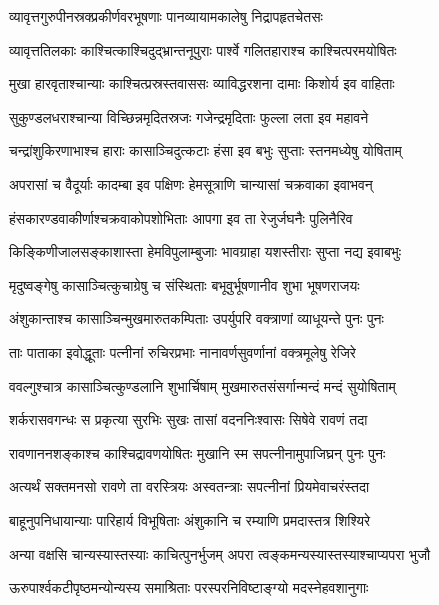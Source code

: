 \twolineshloka
{व्यावृत्तगुरुपीनस्रक्प्रकीर्णवरभूषणाः}
{पानव्यायामकालेषु निद्रापहृतचेतसः} %

\twolineshloka
{व्यावृत्ततिलकाः काश्चित्काश्चिदुद्भ्रान्तनूपुराः}
{पार्श्वे गलितहाराश्च काश्चित्परमयोषितः} %

\twolineshloka
{मुखा हारवृताश्चान्याः काश्चित्प्रस्रस्तवाससः}
{व्याविद्धरशना दामाः किशोर्य इव वाहिताः} %

\twolineshloka
{सुकुण्डलधराश्चान्या विच्छिन्नमृदितस्रजः}
{गजेन्द्रमृदिताः फुल्ला लता इव महावने} %

\twolineshloka
{चन्द्रांशुकिरणाभाश्च हाराः कासाञ्चिदुत्कटाः}
{हंसा इव बभुः सुप्ताः स्तनमध्येषु योषिताम्} %

\twolineshloka
{अपरासां च वैदूर्याः कादम्बा इव पक्षिणः}
{हेमसूत्राणि चान्यासां चक्रवाका इवाभवन्} %

\twolineshloka
{हंसकारण्डवाकीर्णाश्चक्रवाकोपशोभिताः}
{आपगा इव ता रेजुर्जघनैः पुलिनैरिव} %

\twolineshloka
{किङ्किणीजालसङ्काशास्ता हेमविपुलाम्बुजाः}
{भावग्राहा यशस्तीराः सुप्ता नद्य इवाबभुः} %

\twolineshloka
{मृदुष्वङ्गेषु कासाञ्चित्कुचाग्रेषु च संस्थिताः}
{बभूवुर्भूषणानीव शुभा भूषणराजयः} %

\twolineshloka
{अंशुकान्ताश्च कासाञ्चिन्मुखमारुतकम्पिताः}
{उपर्युपरि वक्त्राणां व्याधूयन्ते पुनः पुनः} %

\twolineshloka
{ताः पाताका इवोद्धूताः पत्नीनां रुचिरप्रभाः}
{नानावर्णसुवर्णानां वक्त्रमूलेषु रेजिरे} %

\twolineshloka
{ववल्गुश्चात्र कासाञ्चित्कुण्डलानि शुभार्चिषाम्}
{मुखमारुतसंसर्गान्मन्दं मन्दं सुयोषिताम्} %

\twolineshloka
{शर्करासवगन्धः स प्रकृत्या सुरभिः सुखः}
{तासां वदननिःश्वासः सिषेवे रावणं तदा} %

\twolineshloka
{रावणाननशङ्काश्च काश्चिद्रावणयोषितः}
{मुखानि स्म सपत्नीनामुपाजिघ्रन् पुनः पुनः} %

\twolineshloka
{अत्यर्थं सक्तमनसो रावणे ता वरस्त्रियः}
{अस्वतन्त्राः सपत्नीनां प्रियमेवाचरंस्तदा} %

\twolineshloka
{बाहूनुपनिधायान्याः पारिहार्य विभूषिताः}
{अंशुकानि च रम्याणि प्रमदास्तत्र शिश्यिरे} %

\twolineshloka
{अन्या वक्षसि चान्यस्यास्तस्याः काचित्पुनर्भुजम्}
{अपरा त्वङ्कमन्यस्यास्तस्याश्चाप्यपरा भुजौ} %

\twolineshloka
{ऊरुपार्श्वकटीपृष्ठमन्योन्यस्य समाश्रिताः}
{परस्परनिविष्टाङ्ग्यो मदस्नेहवशानुगाः} %

